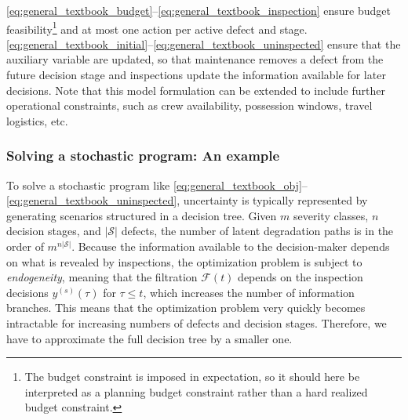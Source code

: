 \cref{eq:general_textbook_budget}--\cref{eq:general_textbook_inspection} ensure budget feasibility\footnote{The budget constraint is imposed in expectation, so it should here be interpreted as a planning budget constraint rather than a hard realized budget constraint.} and at most one action per active defect and stage.
\cref{eq:general_textbook_initial}--\cref{eq:general_textbook_uninspected} ensure that the auxiliary variable are updated, so that maintenance removes a defect from the future decision stage and inspections update the information available for later decisions.%
Note that this model formulation can be extended to include further operational constraints, such as crew availability, possession windows, travel logistics, etc.


\subsubsection{Solving a stochastic program: An example}
To solve a stochastic program like \cref{eq:general_textbook_obj}--\cref{eq:general_textbook_uninspected}, uncertainty is typically represented by generating scenarios structured in a decision tree.
Given $m$ severity classes, $n$ decision stages, and $|\mathcal S|$ defects, the number of latent degradation paths is in the order of $m^{n|\mathcal S|}$.
Because the information available to the decision-maker depends on what is revealed by inspections, the optimization problem is subject to \textit{endogeneity}, 
meaning that the filtration $\mathcal F(t)$ depends on the inspection decisions $y^{(s)}(\tau)$ for $\tau\le t$, which increases the number of information branches.
This means that the optimization problem very quickly becomes intractable for increasing numbers of defects and decision stages.
Therefore, we have to approximate the full decision tree by a smaller one.


